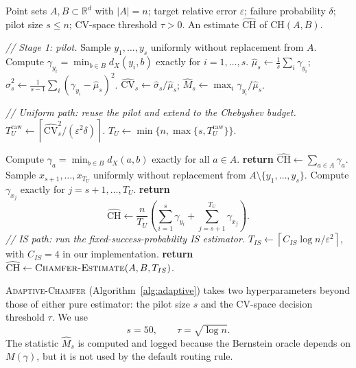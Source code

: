 \documentclass[conference]{IEEEtran}
\begin{document}
\begin{algorithm}[t]
\caption{$\textsc{Adaptive-Chamfer}(A, B, \varepsilon, \delta, s, \tau)$}
\label{alg:adaptive}
\begin{algorithmic}[1]
\REQUIRE Point sets $A,B\subset\mathbb{R}^d$ with $|A|=n$;
target relative error $\varepsilon$; failure probability $\delta$;
pilot size $s\leq n$; CV-space threshold $\tau>0$.
\ENSURE An estimate $\widehat{\mathrm{CH}}$ of $\mathrm{CH}(A,B)$.

\STATE \emph{// Stage 1: pilot.}
\STATE Sample $y_1,\dots,y_s$ uniformly without replacement from $A$.
\STATE Compute $\gamma_{y_i}=\min_{b\in B}d_X(y_i,b)$ exactly for
$i=1,\dots,s$.
\STATE
$\widehat{\mu}_s\gets \tfrac{1}{s}\sum_i\gamma_{y_i}$;\quad
$\widehat{\sigma}_s^2\gets
\tfrac{1}{s-1}\sum_i(\gamma_{y_i}-\widehat{\mu}_s)^2$.
\STATE
$\widehat{\mathrm{CV}}_s\gets \widehat{\sigma}_s/\widehat{\mu}_s$;\quad
$\widehat{M}_s\gets \max_i\gamma_{y_i}/\widehat{\mu}_s$.

    \STATE \emph{// Uniform path: reuse the pilot and extend to the Chebyshev budget.}
    \STATE
    $T_U^{\mathrm{raw}}\gets
    \left\lceil
        \widehat{\mathrm{CV}}_s^2/(\varepsilon^2\delta)
    \right\rceil$.
    \STATE
    $T_U\gets \min\{n,\max\{s,T_U^{\mathrm{raw}}\}\}$.

        \STATE Compute $\gamma_a=\min_{b\in B}d_X(a,b)$ exactly for all $a\in A$.
        \STATE \textbf{return}
        $\widehat{\mathrm{CH}}\gets \sum_{a\in A}\gamma_a$.
    \ELSE
        \STATE Sample $x_{s+1},\dots,x_{T_U}$ uniformly without replacement from
        $A\setminus\{y_1,\dots,y_s\}$.
        \STATE Compute $\gamma_{x_j}$ exactly for $j=s+1,\dots,T_U$.
        \STATE \textbf{return}
        \[
        \widehat{\mathrm{CH}}
        \gets
        \frac{n}{T_U}
        \left(
            \sum_{i=1}^{s}\gamma_{y_i}
            +
            \sum_{j=s+1}^{T_U}\gamma_{x_j}
        \right).
        \]
    \ENDIF
\ELSE
    \STATE \emph{// IS path: run the fixed-success-probability IS estimator.}
    \STATE
    $T_{IS}\gets
    \left\lceil
        C_{IS}\log n/\varepsilon^2
    \right\rceil$,
    with $C_{IS}=4$ in our implementation.
    \STATE \textbf{return}
    $\widehat{\mathrm{CH}}\gets
    \textsc{Chamfer-Estimate}(A,B,T_{IS})$.
\ENDIF
\end{algorithmic}
\end{algorithm}

\textsc{Adaptive-Chamfer} (Algorithm~\ref{alg:adaptive}) takes two
hyperparameters beyond those of either pure estimator: the pilot size
$s$ and the CV-space decision threshold $\tau$. We use
\[
    s=50,
    \qquad
    \tau=\sqrt{\log n}.
\]
The statistic $\widehat{M}_s$ is computed and logged because the
Bernstein oracle depends on $M(\gamma)$, but it is not used by the
default routing rule.
\end{document}
